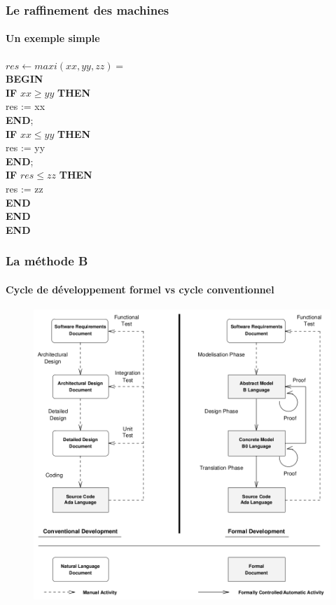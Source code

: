 \documentclass[11pt,a4paper,xcolor=table, handout]{beamer} %
\begin{document}
\begin{frame}
\frametitle{Le raffinement des machines}
\framesubtitle{Un exemple simple}
$res \leftarrow maxi ( xx , yy , zz ) = $ \\
\hspace*{1em}    \textbf{BEGIN} \\
\hspace*{1em}    \textbf{IF} $xx \geq yy$ \textbf{THEN} \\
\hspace*{2em}        res := xx \\
\hspace*{1em}    \textbf{END}; \\
\hspace*{1em}   \textbf{IF} $xx \leq yy$  \textbf{THEN} \\
\hspace*{2em}        res := yy \\
\hspace*{1em}    \textbf{END}; \\
\hspace*{1em}   \textbf{IF} $res \leq zz$ \textbf{THEN} \\
\hspace*{2em}        res := zz \\
\hspace*{1em}    \textbf{END} \\
\hspace*{1em}    \textbf{END} \\
\textbf{END}
\end{frame}

\begin{frame}
\frametitle{La méthode B}
\framesubtitle{Cycle de développement formel vs cycle conventionnel}
\begin{figure}[h]
\centering
\includegraphics[scale=0.22]{ressources/formal_dev.png}
\end{figure}
\end{frame}
\end{document}
